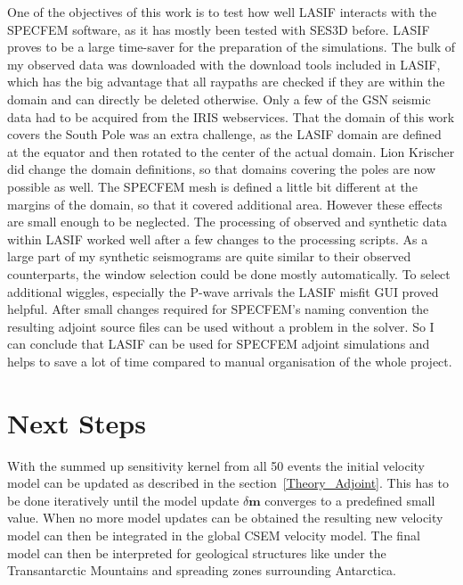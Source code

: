 One of the objectives of this work is to test how well LASIF interacts with the SPECFEM software,
as it has mostly been tested with SES3D before.
LASIF proves to be a large time-saver for the preparation of the simulations. 
The bulk of my observed data was downloaded with the download tools included in LASIF, which 
has the big advantage that all raypaths are checked if they are within the domain and can 
directly be deleted otherwise.
Only a few of the GSN seismic data had to be acquired from the IRIS webservices.
That the domain of this work covers the South Pole was an extra challenge, as the LASIF domain
are defined at the equator and then rotated to the center of the actual domain.
Lion Krischer did change the domain definitions, so that domains covering the poles  are now 
possible as well. 
The SPECFEM mesh is defined a little bit different at the margins of the domain, so that it 
covered additional area. However these effects are small enough to be neglected.
The processing of observed and synthetic data within LASIF worked well after a few changes to
the processing scripts.
As a large part of my synthetic seismograms are quite similar to their observed counterparts,
the window selection could be done mostly automatically. 
To select additional wiggles, especially the P-wave arrivals the LASIF misfit GUI proved helpful.
After small changes required for SPECFEM's naming convention the resulting adjoint source files
can be used without a problem in the solver.
So I can conclude that LASIF can be used for SPECFEM adjoint simulations and helps to save a 
lot of time compared to manual organisation of the whole project.


\section{Next Steps}

With the summed up sensitivity kernel from all 50 events the initial velocity
model can be updated as described in the section~\ref{Theory_Adjoint}.
This has to be done iteratively until the model update $\delta \boldsymbol{m}$
converges to a predefined small value.
When no more model updates can be obtained the resulting new velocity model 
can then be integrated in the global CSEM velocity model.
The final model can then be interpreted for geological structures like 
under the Transantarctic Mountains and spreading zones surrounding Antarctica.

\vspace*{1cm}
